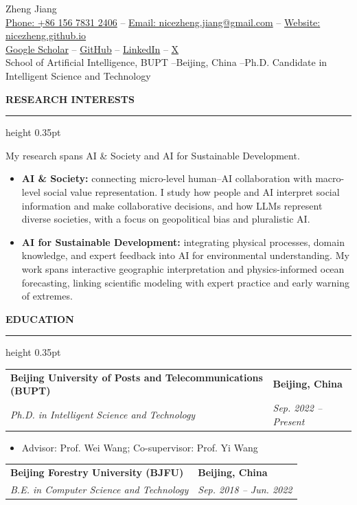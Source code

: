 \documentclass[10pt,letterpaper]{article}
\makeatletter
\newcommand{\cvsection}[2]{%
  \Needspace{5\baselineskip}%
  \vspace{5.5pt}%
  {\color{sectionblue}\bfseries\fontsize{10.8}{12}\selectfont #1}%
  {\normalfont\color{black}\fontsize{9.4}{10.5}\selectfont\ #2}%
  \par\vspace{1.1pt}%
  {\color{rulegray}\hrule height 0.35pt}%
  \vspace{3.5pt}%
}
\newcommand{\educationentry}[4]{%
  \begin{tabularx}{\textwidth}{@{}>{\raggedright\arraybackslash}X >{\raggedleft\arraybackslash}p{1.42in}@{}}
    \textbf{#1} & \textbf{#2} \\
    \textit{#3} & \textit{#4}
  \end{tabularx}\par
}
\makeatother
\begin{document}
\fontsize{9.8}{11.35}\selectfont

\begin{center}
  {\fontsize{20}{22}\selectfont Zheng Jiang}\\[-0.2pt]
  {\fontsize{9.3}{10.5}\selectfont
  \href{tel:+8615678312406}{Phone: +86 156 7831 2406}
  \enspace--\enspace
  \href{mailto:nicezheng.jiang@gmail.com}{Email: nicezheng.jiang@gmail.com}
  \enspace--\enspace
  \href{https://nicezheng.github.io/}{Website: nicezheng.github.io}\\[-0.4pt]
  \href{https://scholar.google.com/citations?user=b60BQmoAAAAJ}{Google Scholar}
  \enspace--\enspace
  \href{https://github.com/nicezheng}{GitHub}
  \enspace--\enspace
  \href{https://www.linkedin.com/in/zheng-jiang-a55502283/}{LinkedIn}
  \enspace--\enspace
  \href{https://x.com/NicezhengJiang}{X}}\\[-0.2pt]
  School of Artificial Intelligence, BUPT
  \enspace--\enspace Beijing, China
  \enspace--\enspace Ph.D. Candidate in Intelligent Science and Technology
\end{center}
\vspace{-4.5pt}

\cvsection{RESEARCH INTERESTS}{}
My research spans AI \& Society and AI for Sustainable Development.
\begin{itemize}
  \item \textbf{AI \& Society:} connecting micro-level human--AI collaboration with macro-level social value representation. I study how people and AI interpret social information and make collaborative decisions, and how LLMs represent diverse societies, with a focus on geopolitical bias and pluralistic AI.
  \item \textbf{AI for Sustainable Development:} integrating physical processes, domain knowledge, and expert feedback into AI for environmental understanding. My work spans interactive geographic interpretation and physics-informed ocean forecasting, linking scientific modeling with expert practice and early warning of extremes.
\end{itemize}

\cvsection{EDUCATION}{}
\educationentry{Beijing University of Posts and Telecommunications (BUPT)}{Beijing, China}{Ph.D. in Intelligent Science and Technology}{Sep. 2022 -- Present}
\begin{itemize}
  \item Advisor: Prof. Wei Wang; Co-supervisor: Prof. Yi Wang
\end{itemize}
\vspace{-1.2pt}
\educationentry{Beijing Forestry University (BJFU)}{Beijing, China}{B.E. in Computer Science and Technology}{Sep. 2018 -- Jun. 2022}
\end{document}
